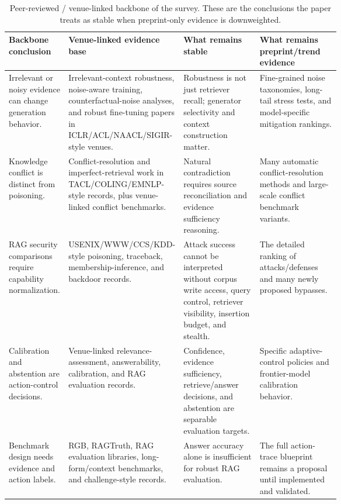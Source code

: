 \begin{table}[t]
\centering
\scriptsize
\renewcommand{\arraystretch}{0.9}
\begin{tabularx}{\linewidth}{>{\raggedright\arraybackslash}p{0.18\linewidth}>{\raggedright\arraybackslash}p{0.25\linewidth}>{\raggedright\arraybackslash}p{0.23\linewidth}X}
\toprule
\textbf{Backbone conclusion} & \textbf{Venue-linked evidence base} & \textbf{What remains stable} & \textbf{What remains preprint/trend evidence} \\
\midrule
Irrelevant or noisy evidence can change generation behavior. & Irrelevant-context robustness, noise-aware training, counterfactual-noise analyses, and robust fine-tuning papers in ICLR/ACL/NAACL/SIGIR-style venues. & Robustness is not just retriever recall; generator selectivity and context construction matter. & Fine-grained noise taxonomies, long-tail stress tests, and model-specific mitigation rankings. \\
Knowledge conflict is distinct from poisoning. & Conflict-resolution and imperfect-retrieval work in TACL/COLING/EMNLP-style records, plus venue-linked conflict benchmarks. & Natural contradiction requires source reconciliation and evidence sufficiency reasoning. & Many automatic conflict-resolution methods and large-scale conflict benchmark variants. \\
RAG security comparisons require capability normalization. & USENIX/WWW/CCS/KDD-style poisoning, traceback, membership-inference, and backdoor records. & Attack success cannot be interpreted without corpus write access, query control, retriever visibility, insertion budget, and stealth. & The detailed ranking of attacks/defenses and many newly proposed bypasses. \\
Calibration and abstention are action-control decisions. & Venue-linked relevance-assessment, answerability, calibration, and RAG evaluation records. & Confidence, evidence sufficiency, retrieve/answer decisions, and abstention are separable evaluation targets. & Specific adaptive-control policies and frontier-model calibration behavior. \\
Benchmark design needs evidence and action labels. & RGB, RAGTruth, RAG evaluation libraries, long-form/context benchmarks, and challenge-style records. & Answer accuracy alone is insufficient for robust RAG evaluation. & The full action-trace blueprint remains a proposal until implemented and validated. \\
\bottomrule
\end{tabularx}
\caption{Peer-reviewed / venue-linked backbone of the survey. These are the conclusions the paper treats as stable when preprint-only evidence is downweighted.}
\label{tab:peer-reviewed-backbone}
\end{table}

